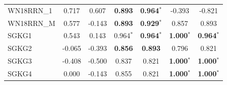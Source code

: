 \begin{table}[t]
{\begin{tabular}{l||cc||cc||cc}
WN18RRN\_1 & 0.717 & 0.607 & \textbf{0.893} & \textbf{0.964}$^*$ & -0.393 & -0.821 \\
WN18RRN\_M & 0.577 & -0.143 & \textbf{0.893} & \textbf{0.929}$^*$ & 0.857 & 0.893 \\
\hline
SGKG1 & 0.543 & 0.143 & 0.964$^*$ & \textbf{0.964}$^*$ & \textbf{1.000}$^*$ & \textbf{0.964}$^*$ \\
SGKG2 & -0.065 & -0.393 & \textbf{0.856} & \textbf{0.893} & 0.796 & 0.821 \\
SGKG3 & -0.408 & -0.500 & 0.837 & 0.821 & \textbf{1.000}$^*$ & \textbf{1.000}$^*$ \\
SGKG4 & 0.000 & -0.143 & 0.855 & 0.821 & \textbf{1.000}$^*$ & \textbf{1.000}$^*$ \\
\hline
\end{tabular}%
}
\end{table}
